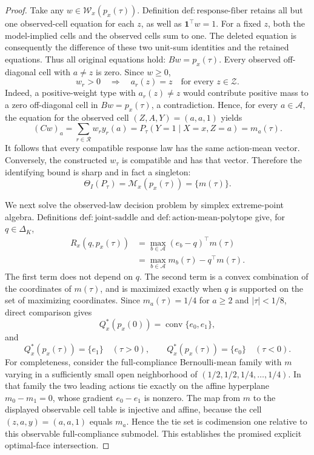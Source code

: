 \documentclass{article}
\begin{document}
\begin{proof}
Take any \(w\in\mathcal W_x(p_x(\tau))\).  Definition \(\mathrm{def{:}response\text{-}fiber}\) retains all but one observed-cell equation for each \(z\), as well as \(\mathbf1^\top w=1\).  For a fixed \(z\), both the model-implied cells and the observed cells sum to one.  The deleted equation is consequently the difference of these two unit-sum identities and the retained equations.  Thus all original equations hold: \(Bw=p_x(\tau)\).  Every observed off-diagonal cell with \(a\neq z\) is zero.  Since \(w\geq0\),
\[
 w_r>0\quad\Longrightarrow\quad a_r(z)=z
 \quad\text{for every }z\in\mathcal Z.
\]
Indeed, a positive-weight type with \(a_r(z)\neq z\) would contribute positive mass to a zero off-diagonal cell in \(Bw=p_x(\tau)\), a contradiction.  Hence, for every \(a\in\mathcal A\), the equation for the observed cell \((Z,A,Y)=(a,a,1)\) yields
\[
 (Cw)_a
 =\sum_{r\in\mathcal R}w_r y_r(a)
 =P_\tau(Y=1\mid X=x,Z=a)
 =m_a(\tau).
\]
It follows that every compatible response law has the same action-mean vector.  Conversely, the constructed \(w_\tau\) is compatible and has that vector.  Therefore the identifying bound is sharp and in fact a singleton:
\[
 \Theta_I(P_\tau)=\mathcal M_x(p_x(\tau))=\{m(\tau)\}.
\]

We next solve the observed-law decision problem by simplex extreme-point algebra.  Definitions \(\mathrm{def{:}joint\text{-}saddle}\) and \(\mathrm{def{:}action\text{-}mean\text{-}polytope}\) give, for \(q\in\Delta_K\),
\[
 \begin{aligned}
 R_x(q,p_x(\tau))
 &=\max_{b\in\mathcal A}(e_b-q)^\top m(\tau)\\
 &=\max_{b\in\mathcal A}m_b(\tau)-q^\top m(\tau).
 \end{aligned}
\]
The first term does not depend on \(q\).  The second term is a convex combination of the coordinates of \(m(\tau)\), and is maximized exactly when \(q\) is supported on the set of maximizing coordinates.  Since \(m_a(\tau)=1/4\) for \(a\geq2\) and \(|\tau|<1/8\), direct comparison gives
\[
 Q_x^*(p_x(0))=\operatorname{conv}\{e_0,e_1\},
\]
and
\[
 Q_x^*(p_x(\tau))=\{e_1\}\quad(\tau>0),
 \qquad
 Q_x^*(p_x(\tau))=\{e_0\}\quad(\tau<0).
\]
For completeness, consider the full-compliance Bernoulli-mean family with \(m\) varying in a sufficiently small open neighborhood of \((1/2,1/2,1/4,\ldots,1/4)\).  In that family the two leading actions tie exactly on the affine hyperplane \(m_0-m_1=0\), whose gradient \(e_0-e_1\) is nonzero.  The map from \(m\) to the displayed observable cell table is injective and affine, because the cell \((z,a,y)=(a,a,1)\) equals \(m_a\).  Hence the tie set is codimension one relative to this observable full-compliance submodel.  This establishes the promised explicit optimal-face intersection.


\end{proof}
\end{document}
